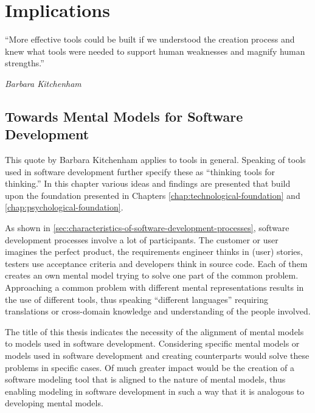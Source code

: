\chapter{Implications}
\label{chap:possible-applications}
\epigraph{``More effective tools could be built if we understood the creation process and knew what tools were needed to support human weaknesses and magnify human strengths.''}{\textit{Barbara Kitchenham}}
\section{Towards Mental Models for Software Development}
This quote by Barbara Kitchenham applies to tools in general.
Speaking of tools used in software development \textcite{kitchenham_research_1990} further specify these as ``thinking tools for thinking.''
In this chapter various ideas and findings are presented that build upon the foundation presented in Chapters \ref{chap:technological-foundation} and \ref{chap:psychological-foundation}.

As shown in \cref{sec:characteristics-of-software-development-processes}, software development processes involve a lot of participants.
The customer or user imagines the perfect product, the requirements engineer thinks in (user) stories, testers use acceptance criteria and developers think in source code.
Each of them creates an own mental model trying to solve one part of the common problem.
Approaching a common problem with different mental representations results in the use of different tools, thus speaking ``different languages'' requiring translations or cross-domain knowledge and understanding of the people involved.

The title of this thesis indicates the necessity of the alignment of mental models to models used in software development.
Considering specific mental models or models used in software development and creating counterparts would solve these problems in specific cases.
Of much greater impact would be the creation of a software modeling tool that is aligned to the nature of mental models, thus enabling modeling in software development in such a way that it is analogous to developing mental models.


